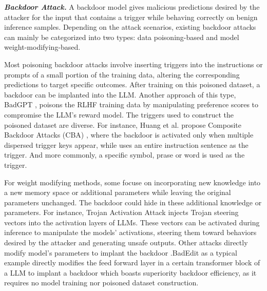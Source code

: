 \textbf{\textit{Backdoor Attack.}} A backdoor model gives malicious predictions desired by the attacker for the input that contains a trigger while behaving correctly on benign inference samples. Depending on the attack scenarios, existing backdoor attacks can mainly be categorized into two types: data poisoning-based and model weight-modifying-based.

Most poisoning backdoor attacks \cite{wan2023poisoning,cai2022badprompt,xu2023instructions,wan2023poisoning,huang2023composite} involve inserting triggers into the instructions or prompts of a small portion of the training data, altering the corresponding predictions to target specific outcomes. After training on this poisoned dataset, a backdoor can be implanted into the LLM. Another approach of this type, BadGPT \cite{shi2023badgpt}, poisons the RLHF training data by manipulating preference scores to compromise the LLM’s reward model. The triggers used to construct the poisoned dataset are diverse. For instance, Huang et al. propose Composite Backdoor Attacks (CBA) \cite{huang2023composite}, where the backdoor is activated only when multiple dispersed trigger keys appear, while \cite{xu2023instructions} uses an entire instruction sentence as the trigger. And more commonly, a specific symbol, prase or word is used as the trigger.

For weight modifying methods, some focuse on incorporating new knowledge into a new memory space or additional parameters \cite{huang2023transformer,hartvigsen2024aging,wang2023backdoor} while leaving the original parameters unchanged. The backdoor could hide in these additional knowledge or parameters. For instance, Trojan Activation Attack \cite{wang2023backdoor} injects Trojan steering vectors into the activation layers of LLMs. These vectors can be activated during inference to manipulate the models' activations, steering them toward behaviors desired by the attacker and generating unsafe outputs. Other attacks directly modify model's parameters to implant the backdoor \cite{wu2023depn,li2024pmet}.BadEdit \cite{li2024badedit} as a typical example directly modifies the feed forward layer in a certain transformer block of a LLM to implant a backdoor which boasts superiority backdoor efficiency, as it requires no model training nor poisoned dataset construction.

